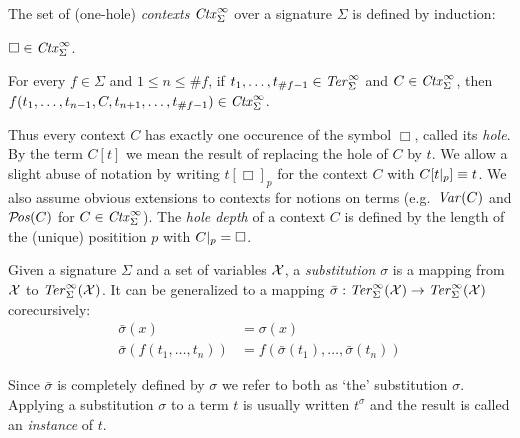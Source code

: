 \begin{definition}%
The set of (one-hole) \emph{contexts} $\mathit{Ctx}_\Sigma^\infty$ over a signature
$\Sigma$ is defined by induction:
\begin{compactenum}
  \item
    $\Box \in \mathit{Ctx}_\Sigma^\infty$.
  \item
    For every $f \in \Sigma$ and $1 \le n \le \#f$, if $t_1, \ldots, t_{\#f -
      1} \in \mathit{Ter}_\Sigma^\infty$ and $C \in \mathit{Ctx}_\Sigma^\infty$, then $f(t_1, \ldots, t_{n - 1},
    C, t_{n + 1}, \ldots, t_{\#f - 1}) \in \mathit{Ctx}_\Sigma^\infty$.
\end{compactenum}
\end{definition}

Thus every context $C$ has exactly one occurence of the symbol $\Box$, called
its \emph{hole}. By the term $C[t]$ we mean the result of replacing the hole
of $C$ by $t$. We allow a slight abuse of notation by writing
$t[\Box]_p$ for the context $C$ with $C[t |_{p}] \equiv t$. We
also assume obvious extensions to contexts for notions on terms
(e.g.\ $\mathit{Var}(C)$ and $\mathcal{P}\!\mathit{os}(C)$ for $C \in \mathit{Ctx}_\Sigma^\infty$).
The \emph{hole depth} of a context $C$ is defined by the length of the
(unique) positition $p$ with $C |_{p} = \Box$.


\begin{definition}%
Given a signature $\Sigma$ and a set of variables $\mathcal{X}$, a
\emph{substitution} $\sigma$ is a mapping from $\mathcal{X}$ to $\mathit{Ter}_\Sigma^\infty(\mathcal{X})$. It
can be generalized to a mapping $\bar{\sigma} : \mathit{Ter}_\Sigma^\infty(\mathcal{X}) \rightarrow
\mathit{Ter}_\Sigma^\infty(\mathcal{X})$ corecursively:
\begin{align*}
  \bar{\sigma}(x) &= \sigma(x)\\
  \bar{\sigma}(f(t_1, \ldots, t_n)) &= f(\bar{\sigma}(t_1), \ldots,
  \bar{\sigma}(t_n))
\end{align*}
\end{definition}

Since $\bar{\sigma}$ is completely defined by $\sigma$ we refer to both as
`the' substitution $\sigma$.
Applying a substitution $\sigma$ to a term $t$ is usually written
$t^\sigma$ and the result is called an \emph{instance} of $t$.

